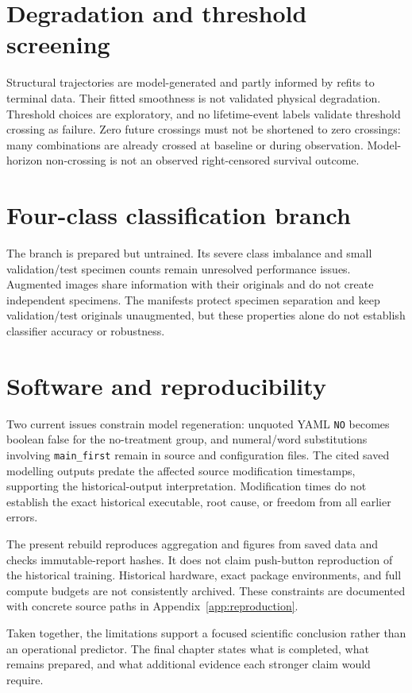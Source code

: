 \section{Degradation and threshold screening}
Structural trajectories are model-generated and partly informed by refits to terminal data. Their fitted smoothness is not validated physical degradation. Threshold choices are exploratory, and no lifetime-event labels validate threshold crossing as failure. Zero future crossings must not be shortened to zero crossings: many combinations are already crossed at baseline or during observation. Model-horizon non-crossing is not an observed right-censored survival outcome.

\section{Four-class classification branch}
The branch is prepared but untrained. Its severe class imbalance and small validation/test specimen counts remain unresolved performance issues. Augmented images share information with their originals and do not create independent specimens. The manifests protect specimen separation and keep validation/test originals unaugmented, but these properties alone do not establish classifier accuracy or robustness.

\section{Software and reproducibility}
Two current issues constrain model regeneration: unquoted YAML \texttt{NO} becomes boolean false for the no-treatment group, and numeral/word substitutions involving \texttt{main\_first} remain in source and configuration files. The cited saved modelling outputs predate the affected source modification timestamps, supporting the historical-output interpretation. Modification times do not establish the exact historical executable, root cause, or freedom from all earlier errors.

The present rebuild reproduces aggregation and figures from saved data and checks immutable-report hashes. It does not claim push-button reproduction of the historical training. Historical hardware, exact package environments, and full compute budgets are not consistently archived. These constraints are documented with concrete source paths in Appendix~\ref{app:reproduction}.

Taken together, the limitations support a focused scientific conclusion rather than an operational predictor. The final chapter states what is completed, what remains prepared, and what additional evidence each stronger claim would require.
